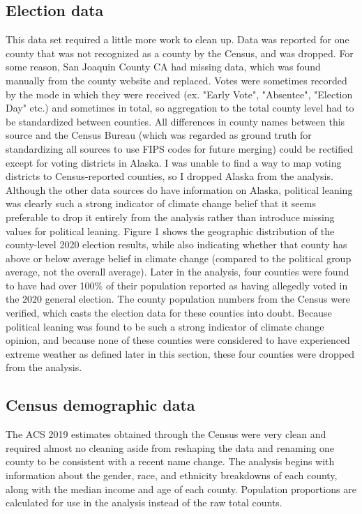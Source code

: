 \documentclass{article}
\begin{document}
\subsection{Election data}
This data set required a little more work to clean up. Data was reported for
one county that was not recognized as a county by the Census, and was dropped. For
some reason, San Joaquin County CA had missing data, which was found 
manually from the county website and replaced. Votes were sometimes
recorded by the mode in which they were received (ex. "Early Vote", 
"Absentee", "Election Day" etc.) and sometimes in total, so aggregation to 
the total county level had to be standardized between counties. All differences in county names between this source and the 
Census Bureau (which was regarded as ground truth for standardizing all sources
to use FIPS codes for future merging) could be rectified except for voting districts in Alaska.
I was unable to find a way to map voting districts to Census-reported
counties, so I dropped Alaska from the analysis. Although the other data
sources do have information on Alaska, political leaning was clearly such a
strong indicator of climate change belief that it seems preferable to
drop it entirely from the analysis rather than introduce missing values for
political leaning.
Figure 1 shows the geographic distribution of the county-level 2020 election
results, while also indicating whether that county has above or below average
belief in climate change (compared to the political group average, not the
overall average).
Later in the analysis, four counties were found to have had over 100\% of their population reported as having allegedly voted in the 2020 general election. The county population numbers from the Census were verified, which casts the election data for these counties into doubt. Because political leaning was found to be such a strong indicator of climate change opinion, and because none of these counties were considered to have experienced extreme weather as defined later in this section, these four counties were dropped from the analysis.

\subsection{Census demographic data}
The ACS 2019 estimates obtained through the Census were very clean and
required almost no cleaning aside from reshaping the data and renaming one
county to be consistent with a recent name change. The analysis begins with  
information about the gender, race, and ethnicity breakdowns of each county,
along with the median income and age of each county. Population
proportions are calculated for use in the analysis instead of the raw total counts.
\end{document}
